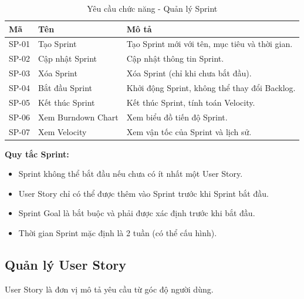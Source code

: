 \documentclass[12pt,a4paper]{report}
\begin{document}
\begin{table}[H]
\centering
\caption{Yêu cầu chức năng - Quản lý Sprint}
\begin{tabular}{|p{2.5cm}|p{3.5cm}|p{8cm}|}
\hline
\textbf{Mã} & \textbf{Tên} & \textbf{Mô tả} \\
\hline
SP-01 & Tạo Sprint & Tạo Sprint mới với tên, mục tiêu và thời gian. \\
\hline
SP-02 & Cập nhật Sprint & Cập nhật thông tin Sprint. \\
\hline
SP-03 & Xóa Sprint & Xóa Sprint (chỉ khi chưa bắt đầu). \\
\hline
SP-04 & Bắt đầu Sprint & Khởi động Sprint, không thể thay đổi Backlog. \\
\hline
SP-05 & Kết thúc Sprint & Kết thúc Sprint, tính toán Velocity. \\
\hline
SP-06 & Xem Burndown Chart & Xem biểu đồ tiến độ Sprint. \\
\hline
SP-07 & Xem Velocity & Xem vận tốc của Sprint và lịch sử. \\
\hline
\end{tabular}
\label{tab:sprint_management_requirements}
\end{table}

\textbf{Quy tắc Sprint:}

\begin{itemize}
\item Sprint không thể bắt đầu nếu chưa có ít nhất một User Story.
\item User Story chỉ có thể được thêm vào Sprint trước khi Sprint bắt đầu.
\item Sprint Goal là bắt buộc và phải được xác định trước khi bắt đầu.
\item Thời gian Sprint mặc định là 2 tuần (có thể cấu hình).
\end{itemize}

\subsection{Quản lý User Story}

User Story là đơn vị mô tả yêu cầu từ góc độ người dùng.
\end{document}
